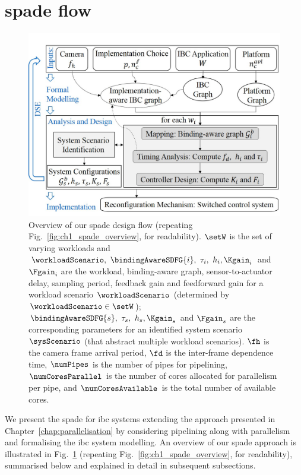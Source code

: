 \section{\texorpdfstring{\Gls{spade}}{SPADe} flow}
\label{sec:ch7_designFlow}

\begin{figure}[t]
\centerline{\includegraphics[width=\textwidth]{images/SPADeOverview5.jpg}}
\caption{Overview of our \gls{spade} design flow (repeating Fig.~\ref{fig:ch1_spade_overview}, for readability). $\setW$ is the set of varying workloads and $\workloadScenario,\ \bindingAwareSDFG{i},\ \tau_i,\ h_i, \Kgain_i$ and $\Fgain_i$ are the workload, binding-aware graph, sensor-to-actuator delay, sampling period, feedback gain and feedforward gain for a workload scenario $\workloadScenario$ (determined by $\workloadScenario\in\setW$); 
$\bindingAwareSDFG{s},\ \tau_s,\ h_s, \Kgain_s$ and $\Fgain_s$ are the corresponding parameters for an identified system scenario $\sysScenario$ (that abstract multiple workload scenarios). $\fh$ is the camera frame arrival period, $\fd$ is the inter-frame dependence time, $\numPipes$ is the number of pipes for pipelining, $\numCoresParallel$ is the number of cores allocated for parallelism per pipe, and $\numCoresAvailable$ is the total number of available cores.}
\label{fig:ch7_ibc_overview}
\end{figure}

We present the \gls{spade} for \gls{ibc} systems extending the approach presented in Chapter~\ref{chap:parallelisation} by considering pipelining along with parallelism and formalising the \gls{ibc} system modelling.
An overview of our \gls{spade} approach is illustrated in Fig.~\ref{fig:ch7_ibc_overview} (repeating Fig.~\ref{fig:ch1_spade_overview}, for readability), summarised below and explained in detail in subsequent subsections.

